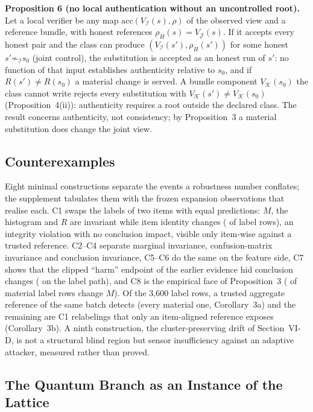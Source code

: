 \documentclass[10pt,journal,compsoc]{IEEEtran}
\begin{document}
\textbf{Proposition 6 (no local authentication without an uncontrolled
root).} Let a local verifier be any map $\mathrm{acc}(V_{\mathcal I}(s),\rho)$
of the observed view and a reference bundle, with honest references
$\rho_H(s)=V_{\mathcal J}(s)$. If it accepts every honest pair and the class
can produce $(V_{\mathcal I}(s'),\rho_H(s'))$ for some honest
$s'\not\sim_{\mathcal I}s_0$ (joint control), the substitution is accepted as
an honest run of $s'$: no function of that input establishes authenticity
relative to $s_0$, and if $R(s')\ne R(s_0)$ a material change is served. A
bundle component $V_{\mathcal K}(s_0)$ the class cannot write rejects every
substitution with $V_{\mathcal K}(s')\ne V_{\mathcal K}(s_0)$
(Proposition~4(ii)): authenticity requires a root outside the declared class.
The result concerns authenticity, not consistency; by Proposition~3 a material
substitution does change the joint view.

\subsection{Counterexamples}

Eight minimal constructions separate the events a robustness number
conflates; the supplement tabulates them with the frozen expansion
observations that realise each. C1 swaps the labels of two items with equal
predictions: $M$, the histogram and $R$ are invariant while item identity
changes (\WitnessWOne{} of \WitnessWOneDen{} label rows), an integrity
violation with no conclusion impact, visible only item-wise against a trusted
reference. C2--C4 separate marginal invariance, confusion-matrix invariance
and conclusion invariance, C5--C6 do the same on the feature side, C7 shows
that the clipped ``harm'' endpoint of the earlier evidence hid
\WitnessWSeven{} conclusion changes (\LabelIncreasedExp{} on the label path),
and C8 is the empirical face of Proposition~3 (\WitnessWEight{} of
\WitnessWEightDen{} material label rows change $M$). Of the 3,600 label rows,
a trusted aggregate reference of the same batch detects \WitnessWNine{}
(every material one, Corollary~3a) and the remaining \WitnessWTen{} are C1
relabelings that only an item-aligned reference exposes (Corollary~3b). A
ninth construction, the cluster-preserving drift of Section~VI-D, is not a
structural blind region but sensor insufficiency against an adaptive
attacker, measured rather than proved.

\subsection{The Quantum Branch as an Instance of the Lattice}
\end{document}
